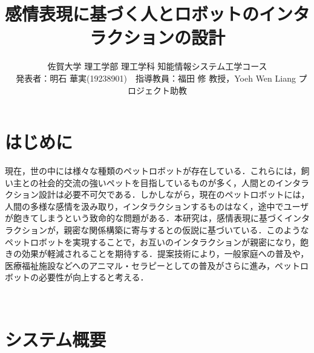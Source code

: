 \documentclass[twocolumn,a4j]{jarticle}
\title{
  感情表現に基づく人とロボットのインタラクションの設計
}
\author{
  佐賀大学 理工学部 理工学科 知能情報システム工学コース \\
  　発表者：明石 華実(19238901)　指導教員：福田 修 教授，Yoeh Wen Liang プロジェクト助教
}
\begin{document}
\date{\empty}
\maketitle
\thispagestyle{empty}

\section{はじめに}
現在，世の中には様々な種類のペットロボットが存在している．これらには，飼い主との社会的交流の強いペットを目指しているものが多く，人間とのインタラクション設計は必要不可欠である．しかしながら，現在のペットロボットには，人間の多様な感情を汲み取り，インタラクションするものはなく，途中でユーザが飽きてしまうという致命的な問題がある\cite{ser2}\cite{ser1}．本研究は，感情表現に基づくインタラクションが，親密な関係構築に寄与するとの仮説に基づいている．このようなペットロボットを実現することで，お互いのインタラクションが親密になり，飽きの効果が軽減されることを期待する．提案技術により，一般家庭への普及や，医療福祉施設などへのアニマル・セラピーとしての普及がさらに進み，ペットロボットの必要性が向上すると考える．

\vspace{-10mm}
\section{システム概要}
\end{document}
